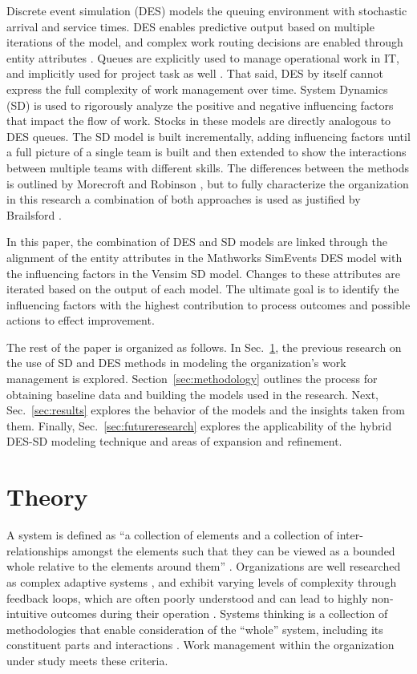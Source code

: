 \documentclass[conference]{IEEEtran}
\begin{document}
Discrete event simulation (DES) models the queuing environment with stochastic arrival and service times. DES enables predictive output based on multiple iterations of the model, and complex work routing decisions are enabled through entity attributes \cite{choi_modeling_2013}. Queues are explicitly used to manage operational work in IT, and implicitly used for project task as well \cite{jensen_dynamic_2006}. That said, DES by itself cannot express the full complexity of work management over time. System Dynamics (SD) is used to rigorously analyze the positive and negative influencing factors that impact the flow of work. Stocks in these models are directly analogous to DES queues. The SD model is built incrementally, adding influencing factors until a full picture of a single team is built and then extended to show the interactions between multiple teams with different skills. The differences between the methods is outlined by Morecroft and Robinson \cite{morecroft_explaining_2014}, but to fully characterize the organization in this research a combination of both approaches is used as justified by Brailsford \cite{brailsford_towards_2010}.

In this paper, the combination of DES and SD models are linked through the alignment of the entity attributes in the Mathworks SimEvents DES model with the influencing factors in the Vensim SD model. Changes to these attributes are iterated based on the output of each model. The ultimate goal is to identify the influencing factors with the highest contribution to process outcomes and possible actions to effect improvement.

The rest of the paper is organized as follows.
In Sec.~\ref{sec:theory}, the previous research on the use of SD and DES methods in modeling the organization's work management is explored. Section~\ref{sec:methodology} outlines the process for obtaining baseline data and building the models used in the research. Next, Sec.~\ref{sec:results} explores the behavior of the models and the insights taken from them. Finally, Sec.~\ref{sec:futureresearch} explores the applicability of the hybrid DES-SD modeling technique and areas of expansion and refinement.

\section{Theory}
\label{sec:theory}

A system is defined as ``a collection of elements and a collection of inter-relationships amongst the elements such that they can be viewed as a bounded whole relative to the elements around them'' \cite{cloutier_guide_2023}. Organizations are well researched as complex adaptive systems \cite{anderson_complexity_1999}, and exhibit varying levels of complexity through feedback loops, which are often poorly understood and can lead to highly non-intuitive outcomes during their operation \cite{forrester_principles_1990}. Systems thinking is a collection of methodologies that enable consideration of the ``whole'' system, including its constituent parts and interactions \cite{caulfield_case_2001}. Work management within the organization under study meets these criteria.
\end{document}
